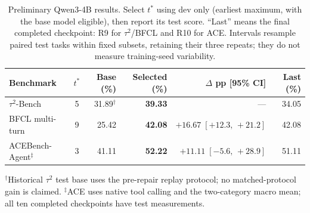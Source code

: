 \begin{table}[t]
\centering
\caption{Preliminary Qwen3-4B results. Select $t^*$ using dev only (earliest maximum, with the base model eligible), then report its test score. ``Last'' means the final completed checkpoint: R9 for $\tau^2$/BFCL and R10 for ACE. Intervals resample paired test tasks within fixed subsets, retaining their three repeats; they do not measure training-seed variability.}
\label{tab:main}
\small
\setlength{\tabcolsep}{3.2pt}
\begin{tabular*}{\linewidth}{@{\extracolsep{\fill}}lcrrrr@{}}
\toprule
Benchmark & $t^*$ & Base (\%) & Selected (\%) & $\Delta$ pp [95\% CI] & Last (\%) \\
\midrule
$\tau^2$-Bench & 5 & 31.89$^{\dagger}$ & \textbf{39.33} & $\text{---}$ & 34.05 \\
BFCL multi-turn & 9 & 25.42 & \textbf{42.08} & $+16.67\;[+12.3,\,+21.2]$ & 42.08 \\
ACEBench-Agent$^{\ddagger}$ & 3 & 41.11 & \textbf{52.22} & $+11.11\;[-5.6,\,+28.9]$ & 51.11 \\
\bottomrule
\end{tabular*}
\vspace{3pt}
\parbox{\linewidth}{\footnotesize $^{\dagger}$Historical $\tau^2$ test base uses the pre-repair replay protocol; no matched-protocol gain is claimed. $^{\ddagger}$ACE uses native tool calling and the two-category macro mean; all ten completed checkpoints have test measurements.}
\end{table}
